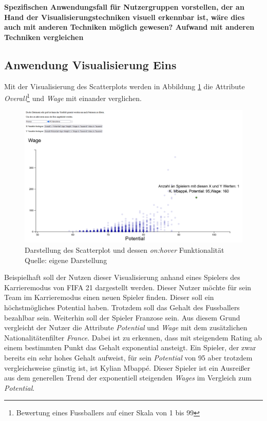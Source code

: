 \documentclass[usegeometry=true]{scrartcl}
\begin{document}
\textbf{Spezifischen Anwendungsfall für Nutzergruppen vorstellen, der an Hand der Visualisierungstechniken visuell erkennbar ist, wäre dies auch mit anderen Techniken möglich gewesen? Aufwand mit anderen Techniken vergleichen}


\subsection{Anwendung Visualisierung Eins}
Mit der Visualisierung des Scatterplots werden in Abbildung \ref{SP5} die Attribute \textit{Overall}\footnote{Bewertung eines Fussballers auf einer Skala von 1 bis 99} und \textit{Wage} mit einander verglichen.
\begin{figure}[h!]
\centering
\includegraphics[scale=0.5]{grafiken/Scatterplot5}
\caption{Darstellung des Scatterplot und dessen \textit{on:hover} Funktionalität\\ Quelle: eigene Darstellung}
\label{SP5}
\end{figure}
Beispielhaft soll der Nutzen dieser Visualisierung anhand eines Spielers des Karrieremodus von FIFA 21 dargestellt werden.
Dieser Nutzer möchte für sein Team im Karrieremodus einen neuen Spieler finden. Dieser soll ein höchstmögliches Potential haben. Trotzdem soll das Gehalt des Fussballers bezahlbar sein. Weiterhin soll der Spieler Franzose sein. Aus diesem Grund vergleicht der Nutzer die Attribute \textit{Potential} und \textit{Wage} mit dem zusätzlichen Nationalitätenfilter \textit{France}. Dabei ist zu erkennen, dass mit steigendem Rating ab einem bestimmten Punkt das Gehalt exponential ansteigt. Ein Spieler, der zwar bereits ein sehr hohes Gehalt aufweist, für sein \textit{Potential} von 95 aber trotzdem vergleichsweise günstig ist, ist Kylian Mbappé. Dieser Spieler ist ein Ausreißer aus dem generellen Trend der exponentiell steigenden \textit{Wages} im Vergleich zum \textit{Potential}.
\end{document}
